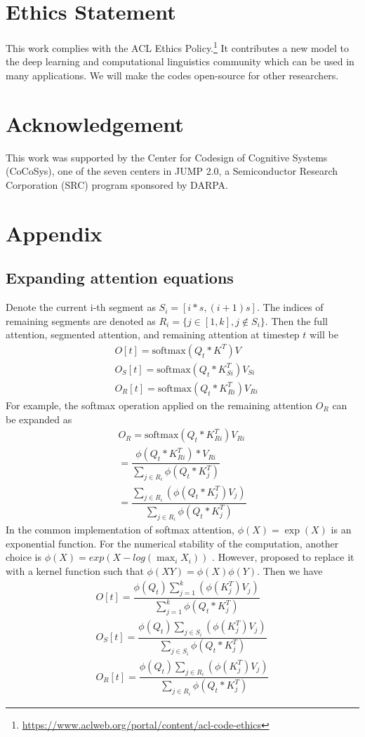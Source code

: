 \documentclass[11pt]{article}
\begin{document}
\section*{Ethics Statement}
This work complies with the ACL Ethics Policy.\footnote{\url{https://www.aclweb.org/portal/content/acl-code-ethics}} It contributes a new model to the deep learning and computational linguistics community which can be used in many applications. We will make the codes open-source for other researchers.


\section*{Acknowledgement}
This work was supported by the Center for Codesign of Cognitive Systems (CoCoSys), one of the seven centers in JUMP 2.0, a Semiconductor Research Corporation (SRC) program sponsored by DARPA.




\newpage
\appendix
\section{Appendix}
\subsection{Expanding attention equations}
\label{sec:appendix}
Denote the current i-th segment as $S_i=[ i*s,(i+1)s]$. The indices of remaining segments are denoted as $R_i=\{j\in[1,k], j\notin S_i \}$. Then the full attention, segmented attention, and remaining attention at timestep $t$ will be
\begin{align*}
& O[t]= \text{softmax}(Q_t*K^T) V\\
& O_{S}[t]=\text{softmax}(Q_t*K_{Si}^T) V_{Si}\\
& O_{R}[t]=\text{softmax}(Q_t*K_{Ri}^T) V_{Ri}
\end{align*} 
For example, the softmax operation applied on the remaining attention $O_R$ can be expanded as
\begin{align}
    O_R = \text{softmax}(Q_t*K_{Ri}^T) V_{Ri} \\
    =\dfrac{\phi(Q_t * K_{Ri}^T)* V_{Ri}}{\sum_{j\in R_i} \phi(Q_t * K_j^T) } \\
    = \dfrac{ \sum_{j\in R_i} ( \phi(Q_t*K_j^T) V_j)}{ \sum_{j\in R_i} \phi(Q_t * K_j^T) }  
\end{align} 
In the common implementation of softmax attention, $\phi(X)=\exp(X)$ is an exponential function. For the numerical stability of the computation, another choice is $\phi(X)=exp(X-log(\max_i X_i))$ \cite{softmax}. However, \citet{transformerRNN} proposed to replace it with a kernel function such that $\phi(XY) = \phi(X)\phi(Y)$. Then we have \begin{align}
O[t]= \dfrac{\phi(Q_t) \sum_{j=1}^k ( \phi(K_j^T) V_j)}{ \sum_{j=1}^k \phi(Q_t * K_j^T) } \\
    O_S[t]= \dfrac{\phi(Q_t) \sum_{j\in S_i} ( \phi(K_j^T) V_j)}{ \sum_{j\in S_i} \phi(Q_t * K_j^T) }  \\
    O_R[t]= \dfrac{\phi(Q_t) \sum_{j\in R_i} ( \phi(K_j^T) V_j)}{ \sum_{j\in R_i} \phi(Q_t * K_j^T) } \label{expand-or}
\end{align}
\end{document}
